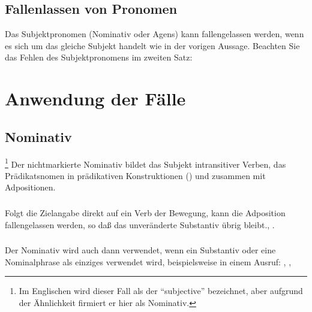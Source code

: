 \subsection{Fallenlassen von Pronomen} Das Subjektpronomen (Nominativ oder Agens)
kann fallengelassen werden, wenn es sich um das gleiche Subjekt handelt wie in der
vorigen Aussage. Beachten Sie das Fehlen des Subjektpronomens im zweiten Satz:

\begin{quotation}
\noindent{}

\medskip
\noindent{}
\end{quotation}


\section{Anwendung der F\"alle}
\label{syn:cases}
\subsection{Nominativ}\footnote{Im Englischen wird dieser Fall als der "`subjective"'
bezeichnet, aber aufgrund der \"Ahnlichkeit firmiert er hier als Nominativ.} Der
nichtmarkierte Nominativ bildet das Subjekt intransitiver Verben, das Pr\"adikatsnomen
in pr\"adikativen Konstruktionen () und zusammen mit
Adpositionen.

\subsubsection{} Folgt die Zielangabe direkt auf ein Verb der Bewegung, kann die
Adposition  fallengelassen werden, so da\ss{} das unver\"anderte Substantiv
\"ubrig bleibt.,
.\label{syn:subjective:ne}

\subsubsection{} Der Nominativ wird auch dann verwendet, wenn ein Substantiv oder eine
Nominalphrase als einziges verwendet wird, beispielsweise in einem Ausruf:
,
, 

